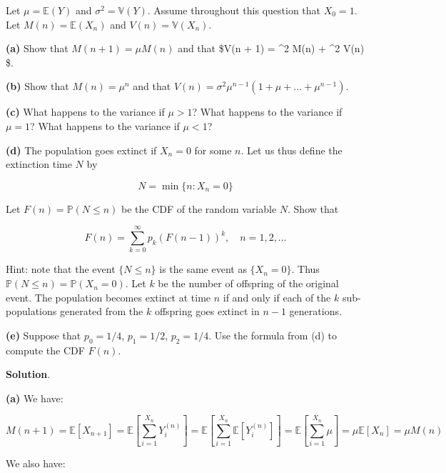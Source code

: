 Let \(\mu = \mathbb{E}(Y)\) and \(\sigma^2 = \mathbb{V}(Y)\). Assume
throughout this question that \(X_0 = 1\). Let
\(M(n) = \mathbb{E}(X_n)\) and \(V(n) = \mathbb{V}(X_n)\).

\textbf{(a)} Show that \(M(n + 1) = \mu M(n)\) and that \$V(n + 1) =
\sigma\^{}2 M(n) + \mu\^{}2 V(n) \$.

\textbf{(b)} Show that \(M(n) = \mu^n\) and that
\(V(n) = \sigma^2 \mu^{n-1} (1 + \mu + \dots + \mu^{n - 1})\).

\textbf{(c)} What happens to the variance if \(\mu > 1\)? What happens
to the variance if \(\mu = 1\)? What happens to the variance if
\(\mu < 1\)?

\textbf{(d)} The population goes extinct if \(X_n = 0\) for some \(n\).
Let us thus define the extinction time \(N\) by

\[ N = \min \{ n : X_n = 0 \} \]

Let \(F(n) = \mathbb{P}(N \leq n)\) be the CDF of the random variable
\(N\). Show that

\[ F(n) = \sum_{k=0}^\infty p_k \left( F(n - 1) \right)^k, \quad n = 1, 2, \dots \]

Hint: note that the event \(\{ N \leq n \}\) is the same event as
\(\{ X_n = 0 \}\). Thus \(\mathbb{P}(N \leq n) = \mathbb{P}(X_n = 0)\).
Let \(k\) be the number of offspring of the original event. The
population becomes extinct at time \(n\) if and only if each of the
\(k\) sub-populations generated from the \(k\) offspring goes extinct in
\(n - 1\) generations.

\textbf{(e)} Suppose that \(p_0 = 1/4\), \(p_1 = 1/2\), \(p_2 = 1/4\).
Use the formula from (d) to compute the CDF \(F(n)\).

\textbf{Solution}.

\textbf{(a)} We have:

\[ M(n + 1) = \mathbb{E}[X_{n + 1}] = \mathbb{E}\left[ \sum_{i = 1}^{X_n} Y_i^{(n)} \right] = \mathbb{E}\left[ \sum_{i = 1}^{X_n} \mathbb{E}[Y_i^{(n)}] \right] = \mathbb{E}\left[ \sum_{i = 1}^{X_n} \mu \right]  = \mu \mathbb{E}[X_n] = \mu M(n)\]

We also have:

